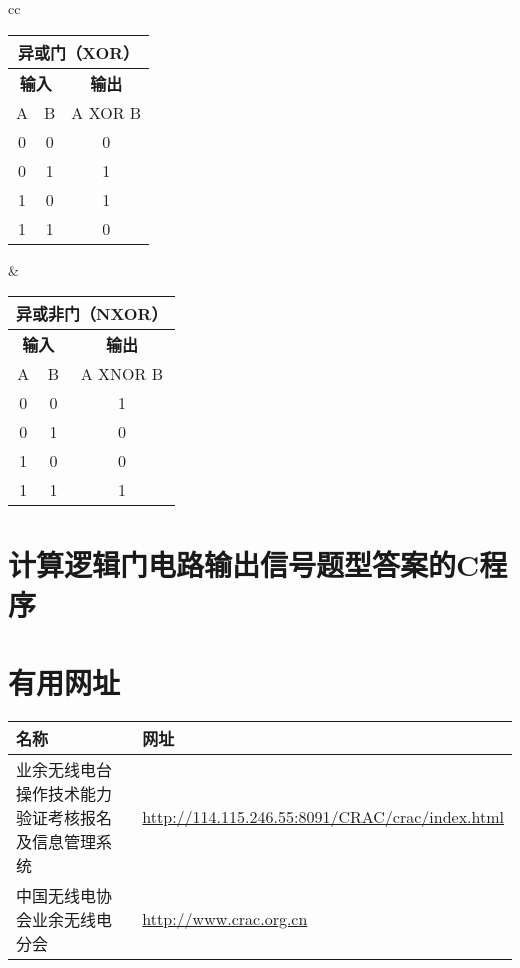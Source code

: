 \bigskip

\begin{tabular}{cc}%
	\begin{tabular}{|c|c|c|}
		\multicolumn{3}{c}{\textbf{异或门（XOR）}} \\
		\hline
		\multicolumn{2}{|c|}{\textbf{输入}} & \textbf{输出} \\
		\hline
		A & B & A XOR B \\
		\hline
		0 & 0 & 0 \\
		\hline
		0 & 1 & 1 \\
		\hline
		1 & 0 & 1 \\
		\hline
		1 & 1 & 0 \\
		\hline
	\end{tabular} &
	\begin{tabular}{|c|c|c|}
		\multicolumn{3}{c}{\textbf{异或非门（NXOR）}} \\
		\hline
		\multicolumn{2}{|c|}{\textbf{输入}} & \textbf{输出} \\
		\hline
		A & B & A XNOR B \\
		\hline
		0 & 0 & 1 \\
		\hline
		0 & 1 & 0 \\
		\hline
		1 & 0 & 0 \\
		\hline
		1 & 1 & 1 \\
		\hline
	\end{tabular} \tabularnewline
\end{tabular}

\newpage

\section{计算逻辑门电路输出信号题型答案的C程序}



\newpage

\section{有用网址}

\begin{longtable}{|p{8cm}|p{8cm}|}
	\hline
	\textbf{名称} & \textbf{网址} \\
	\hline
	业余无线电台操作技术能力验证考核报名及信息管理系统 & \url{http://114.115.246.55:8091/CRAC/crac/index.html} \\
	\hline
	中国无线电协会业余无线电分会 & \url{http://www.crac.org.cn} \\
	\hline
\end{longtable}

